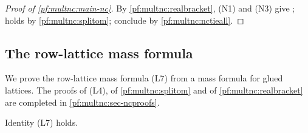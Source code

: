 \begin{proof}[Proof of \cref{pf:multnc:main-nc}]
By \cref{pf:multnc:realbracket}, (N1) and (N3) give ;  holds by \cref{pf:multnc:splitom};
conclude by \cref{pf:multnc:nctieall}.
\end{proof}

\subsection{The row-lattice mass formula}\label{pf:multnc:sec-ncin}

We prove the row-lattice mass formula (L7) from a mass formula for glued lattices. The proofs of (L4), of
\cref{pf:multnc:splitom} and of \cref{pf:multnc:realbracket} are completed in \cref{pf:multnc:sec-ncproofs}.

\begin{proposition}\label{pf:multnc:rowmass}
Identity (L7) holds.
\end{proposition}

